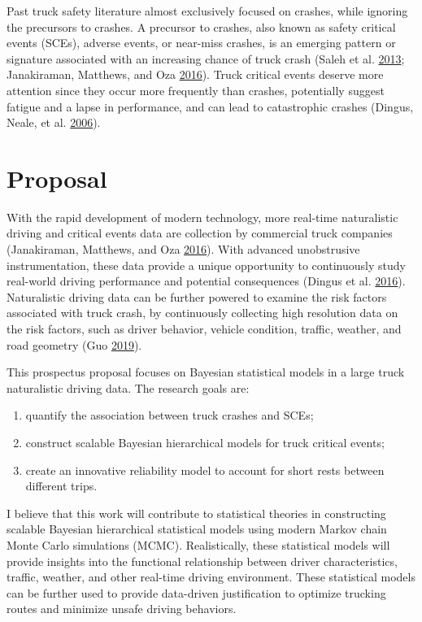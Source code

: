 \documentclass[12pt]{book}
\numberwithin{equation}{chapter}
\providecommand{\tightlist}{%
  \setlength{\itemsep}{0pt}\setlength{\parskip}{0pt}}
\begin{document}
Past truck safety literature almost exclusively focused on crashes, while ignoring the precursors to crashes. A precursor to crashes, also known as safety critical events (SCEs), adverse events, or near-miss crashes, is an emerging pattern or signature associated with an increasing chance of truck crash (Saleh et al. \protect\hyperlink{ref-saleh2013accident}{2013}; Janakiraman, Matthews, and Oza \protect\hyperlink{ref-janakiraman2016discovery}{2016}). Truck critical events deserve more attention since they occur more frequently than crashes, potentially suggest fatigue and a lapse in performance, and can lead to catastrophic crashes (Dingus, Neale, et al. \protect\hyperlink{ref-dingus2006development}{2006}).

\hypertarget{proposal}{%
\section{Proposal}\label{proposal}}

With the rapid development of modern technology, more real-time naturalistic driving and critical events data are collection by commercial truck companies (Janakiraman, Matthews, and Oza \protect\hyperlink{ref-janakiraman2016discovery}{2016}). With advanced unobstrusive instrumentation, these data provide a unique opportunity to continuously study real-world driving performance and potential consequences (Dingus et al. \protect\hyperlink{ref-dingus2016driver}{2016}). Naturalistic driving data can be further powered to examine the risk factors associated with truck crash, by continuously collecting high resolution data on the risk factors, such as driver behavior, vehicle condition, traffic, weather, and road geometry (Guo \protect\hyperlink{ref-guo2019statistical}{2019}).

This prospectus proposal focuses on Bayesian statistical models in a large truck naturalistic driving data. The research goals are:

\begin{enumerate}
\def\labelenumi{\arabic{enumi})}
\tightlist
\item
  quantify the association between truck crashes and SCEs;
\item
  construct scalable Bayesian hierarchical models for truck critical events;
\item
  create an innovative reliability model to account for short rests between different trips.
\end{enumerate}

I believe that this work will contribute to statistical theories in constructing scalable Bayesian hierarchical statistical models using modern Markov chain Monte Carlo simulations (MCMC). Realistically, these statistical models will provide insights into the functional relationship between driver characteristics, traffic, weather, and other real-time driving environment. These statistical models can be further used to provide data-driven justification to optimize trucking routes and minimize unsafe driving behaviors.
\end{document}

